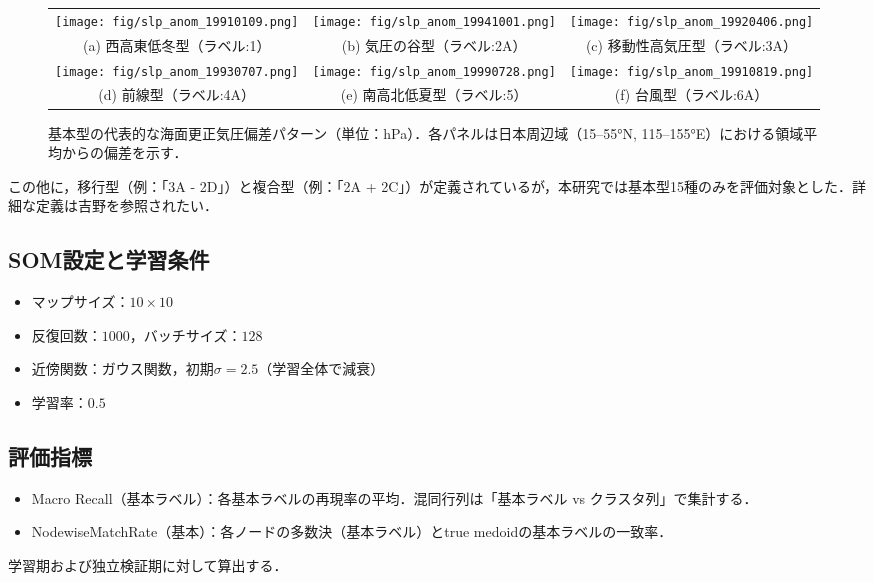 \documentclass{jarticle}
\theoremstyle{definition}
\begin{document}
\begin{figure*}[t!]
\centering
\begin{tabular}{ccc}
\texttt{[image: fig/slp\_anom\_19910109.png]} &
\texttt{[image: fig/slp\_anom\_19941001.png]} &
\texttt{[image: fig/slp\_anom\_19920406.png]} \\
(a) 西高東低冬型（ラベル:1） & (b) 気圧の谷型（ラベル:2A） & (c) 移動性高気圧型（ラベル:3A） \\
\texttt{[image: fig/slp\_anom\_19930707.png]} &
\texttt{[image: fig/slp\_anom\_19990728.png]} &
\texttt{[image: fig/slp\_anom\_19910819.png]} \\
(d) 前線型（ラベル:4A） & (e) 南高北低夏型（ラベル:5） & (f) 台風型（ラベル:6A） \\
\end{tabular}
\caption{基本型の代表的な海面更正気圧偏差パターン（単位：hPa）．各パネルは日本周辺域（15–55°N, 115–155°E）における領域平均からの偏差を示す．}
\label{fig:basic_patterns}
\end{figure*}

この他に，移行型（例：「3A - 2D」）と複合型（例：「2A + 2C」）が定義されているが，本研究では基本型15種のみを評価対象とした．詳細な定義は吉野\cite{吉野2002日本の気候}を参照されたい．

\subsection{SOM設定と学習条件}
\begin{itemize}
\item マップサイズ：$10\times 10$
\item 反復回数：$1000$，バッチサイズ：$128$
\item 近傍関数：ガウス関数，初期$\sigma=2.5$（学習全体で減衰）
\item 学習率：$0.5$
\end{itemize}

\subsection{評価指標}
\begin{itemize}
\item Macro Recall（基本ラベル）：各基本ラベルの再現率の平均．混同行列は「基本ラベル vs クラスタ列」で集計する．
\item NodewiseMatchRate（基本）：各ノードの多数決（基本ラベル）とtrue medoidの基本ラベルの一致率．
\end{itemize}
学習期および独立検証期に対して算出する．
\end{document}
